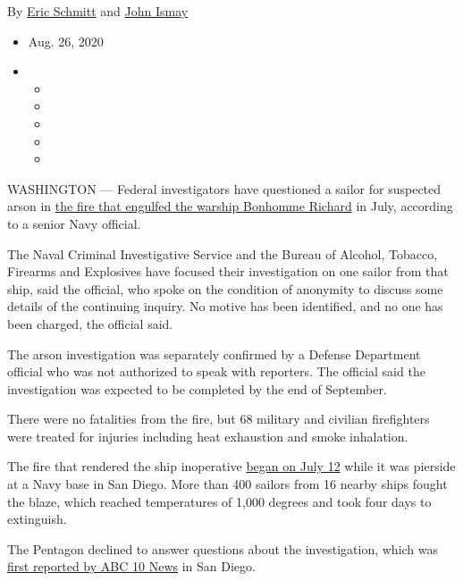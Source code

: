 By \href{https://www.nytimes3xbfgragh.onion/by/eric-schmitt}{Eric
Schmitt} and
\href{https://www.nytimes3xbfgragh.onion/by/john-ismay}{John Ismay}

\begin{itemize}
\item
  Aug. 26, 2020
\item
  \begin{itemize}
  \item
  \item
  \item
  \item
  \item
  \end{itemize}
\end{itemize}

WASHINGTON --- Federal investigators have questioned a sailor for
suspected arson in
\href{https://www.nytimes3xbfgragh.onion/2020/07/13/us/naval-ship-fire-san-diego.html}{the
fire that engulfed the warship Bonhomme Richard} in July, according to a
senior Navy official.

The Naval Criminal Investigative Service and the Bureau of Alcohol,
Tobacco, Firearms and Explosives have focused their investigation on one
sailor from that ship, said the official, who spoke on the condition of
anonymity to discuss some details of the continuing inquiry. No motive
has been identified, and no one has been charged, the official said.

The arson investigation was separately confirmed by a Defense Department
official who was not authorized to speak with reporters. The official
said the investigation was expected to be completed by the end of
September.

There were no fatalities from the fire, but 68 military and civilian
firefighters were treated for injuries including heat exhaustion and
smoke inhalation.

The fire that rendered the ship inoperative
\href{https://www.nytimes3xbfgragh.onion/2020/07/12/us/naval-ship-fire-san-diego.html}{began
on July 12} while it was pierside at a Navy base in San Diego. More than
400 sailors from 16 nearby ships fought the blaze, which reached
temperatures of 1,000 degrees and took four days to extinguish.

The Pentagon declined to answer questions about the investigation, which
was
\href{https://www.10news.com/news/local-news/sources-sailor-possibly-linked-to-uss-bonhomme-richard-ship-fire-under-investigation}{first
reported by ABC 10 News} in San Diego.

